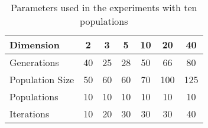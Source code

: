   \begin{table}
    \small
    \caption{Parameters used in the experiments with ten populations
    }
    \label{tab:params:10}
    \vspace{0.25cm}
    \centering
    \small
    \begin{tabular}{|l|c|c|c|c|c|c|}
      \hline
      Dimension        & 2  & 3  & 5  & 10 & 20  & 40  \\ \hline
      Generations      & 40 & 25 & 28 & 50 & 66  & 80  \\ \hline
      Population Size  & 50 & 60 & 60 & 70 & 100 & 125 \\ \hline
      Populations      & 10 & 10 & 10 & 10 & 10  & 10  \\ \hline
      Iterations       & 10 & 20 & 30 & 30 & 30  & 40  \\ \hline  
    \end{tabular}
\end{table}








